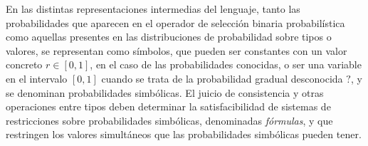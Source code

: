 En las distintas representaciones intermedias del lenguaje, tanto las probabilidades que aparecen en el operador de selección binaria probabilística como aquellas presentes en las distribuciones de probabilidad sobre tipos o valores, se representan como símbolos, que pueden ser constantes con un valor concreto $r\in[0,1]$, en el caso de las probabilidades conocidas, o ser una variable en el intervalo $[0,1]$ cuando se trata de la probabilidad gradual desconocida $?$, y se denominan probabilidades simbólicas. El juicio de consistencia y otras operaciones entre tipos deben determinar la satisfacibilidad de sistemas de restricciones sobre probabilidades simbólicas, denominadas \emph{fórmulas}, y que restringen los valores simultáneos que las probabilidades simbólicas pueden tener.


